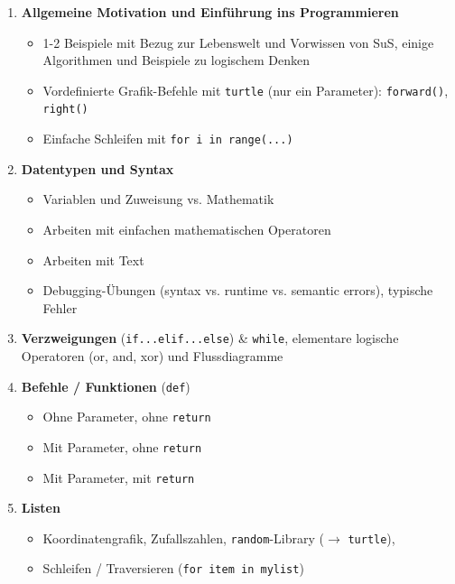 \begin{overviewBox}[title=Überblick der Themen]
	\begin{enumerate}
		\item \textbf{Allgemeine Motivation und Einführung ins Programmieren}
		      \begin{itemize}
			      \item 1-2 Beispiele mit Bezug zur Lebenswelt und Vorwissen von SuS, einige Algorithmen und Beispiele zu logischem Denken
			      \item Vordefinierte Grafik-Befehle mit \lstinline|turtle| (nur ein Parameter): \lstinline|forward()|, \lstinline|right()|
			      \item Einfache Schleifen mit \lstinline|for i in range(...)|
		      \end{itemize}
		\item \textbf{Datentypen und Syntax}
		      \begin{itemize}
			      \item Variablen und Zuweisung vs. Mathematik
			      \item Arbeiten mit einfachen mathematischen Operatoren
			      \item Arbeiten mit Text
			      \item Debugging-Übungen (syntax vs. runtime vs. semantic errors), typische Fehler
		      \end{itemize}
		\item \textbf{Verzweigungen} (\lstinline|if...elif...else|) \& \lstinline|while|,  elementare logische Operatoren (or, and, xor)  und Flussdiagramme
		\item \textbf{Befehle / Funktionen} (\lstinline|def|)
		      \begin{itemize}
			      \item Ohne Parameter, ohne \lstinline|return|
			      \item Mit Parameter, ohne \lstinline|return|
			      \item Mit Parameter, mit \lstinline|return|
		      \end{itemize}
		\item \textbf{Listen}
		      \begin{itemize}
			      \item  Koordinatengrafik, Zufallszahlen, \lstinline|random|-Library ($\rightarrow$ \lstinline|turtle|), \item Schleifen / Traversieren (\lstinline|for item in mylist|)
		      \end{itemize}
	\end{enumerate}
\end{overviewBox}


